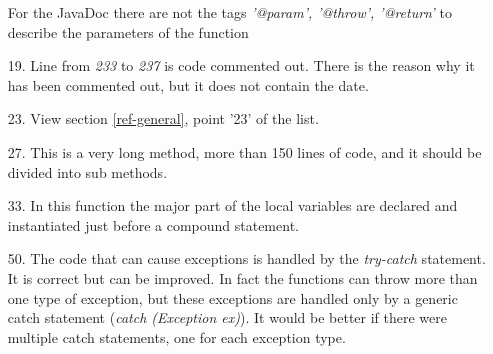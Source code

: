 \begin{itemize}
            For the JavaDoc there are not the tags \textit{'@param', '@throw', '@return'} to describe the parameters of the function
        \item [19.] 
            Line from \textit{233} to \textit{237} is code commented out. There is the reason why it has been commented out, but it does not contain the date.
        \item[23.] 
            View section \ref{ref-general}, point '23' of the list.
        \item[27.] 
            This is a very long method, more than 150 lines of code, and it should be divided into sub methods.
        \item[33.] 
            In this function the major part of the local variables are declared and instantiated just before a compound statement.
        \item[50.] The code that can cause exceptions is handled by the \textit{try-catch} statement. It is correct but can be improved. In fact the functions can throw more than one type of exception, but these exceptions are handled only by a generic catch statement (\textit{catch (Exception ex)}). It would be better if there were multiple catch statements, one for each exception type. 
    \end{itemize}